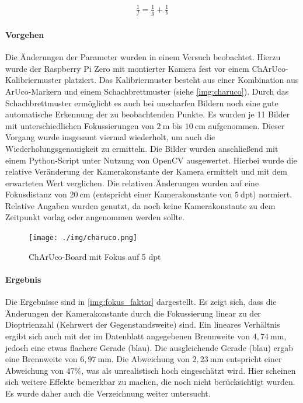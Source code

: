 \documentclass[./00PhotoBox.tex]{subfiles}
\begin{document}
\begin{align}
    \frac{1}{f} = \frac{1}{g} + \frac{1}{b}
    \label{eq:kraus_fokus}
\end{align}

\paragraph{Vorgehen}
Die Änderungen der Parameter wurden in einem Versuch beobachtet. Hierzu wurde der Raspberry Pi Zero mit montierter Kamera fest vor einem ChArUco-Kalibriermuster platziert. Das Kalibriermuster besteht aus einer Kombination aus ArUco-Markern und einem Schachbrettmuster (siehe \autoref{img:charuco}). Durch das Schachbrettmuster ermöglicht es auch bei unscharfen Bildern noch eine gute automatische Erkennung der zu beobachtenden Punkte. Es wurden je 11 Bilder mit unterschiedlichen Fokussierungen von $2~\text{m}$ bis  $10~\text{cm}$ aufgenommen. Dieser Vorgang wurde insgesamt viermal wiederholt, um auch die Wiederholungsgenauigkeit zu ermitteln. Die Bilder wurden anschließend mit einem Python-Script unter Nutzung von OpenCV ausgewertet. Hierbei wurde die relative Veränderung der Kamerakonstante der Kamera ermittelt und mit dem erwarteten Wert verglichen. Die relativen Änderungen wurden auf eine Fokusdistanz von $20~\text{cm}$ (entspricht einer Kamerakonstante von $5~\text{dpt}$) normiert. Relative Angaben wurden genutzt, da noch keine Kamerakonstante zu dem Zeitpunkt vorlag oder angenommen werden sollte.

\begin{figure}
    \centering
    \texttt{[image: ./img/charuco.png]}
    \caption{ChArUco-Board mit Fokus auf 5 dpt} %
    \label{img:charuco} %
\end{figure}

\paragraph{Ergebnis}
Die Ergebnisse sind in \autoref{img:fokus_faktor} dargestellt. Es zeigt sich, dass die Änderungen der Kamerakonstante durch die Fokussierung linear zu der Dioptrienzahl (Kehrwert der Gegenstandsweite) sind. Ein lineares Verhältnis ergibt sich auch mit der im Datenblatt angegebenen Brennweite von $4,74~\text{mm}$, jedoch eine etwas flachere Gerade (blau). Die ausgleichende Gerade (blau) ergab eine Brennweite von $6,97~\text{mm}$. Die Abweichung von $2,23~\text{mm}$ entspricht einer Abweichung von $47\%$, was als unrealistisch hoch eingeschätzt wird. Hier scheinen sich weitere Effekte bemerkbar zu machen, die noch nicht berücksichtigt wurden. Es wurde daher auch die Verzeichnung weiter untersucht.
\end{document}
